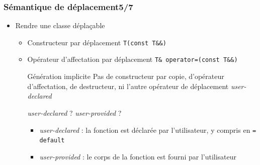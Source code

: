 \documentclass[C++.tex]{subfiles}
\begin{document}
\begin{frame}
	\frametitle{Sémantique de déplacement\titlehfill{}5/7}
	\begin{itemize}
		\item Rendre une classe déplaçable
		\begin{itemize}
			\item Constructeur par déplacement \lstinline|T(const T&&)|
			\item Opérateur d'affectation par déplacement \lstinline|T& operator=(const T&&)|

			\begin{block}{Génération implicite}
				Pas de constructeur par copie, d'opérateur d'affectation, de destructeur, ni l'autre \og opérateur\fg{} de déplacement \textit{user-declared}
			\end{block}
		
			\begin{alertblock}{\textit{user-declared} ? \textit{user-provided} ?}
				\begin{itemize}
					\item \textit{user-declared} : la fonction est déclarée par l'utilisateur, y compris en \lstinline|= default| 
					\item \textit{user-provided} : le corps de la fonction est fourni par l'utilisateur

				\end{itemize}
			\end{alertblock}
		\end{itemize}
	\end{itemize}
\end{frame}
\end{document}
